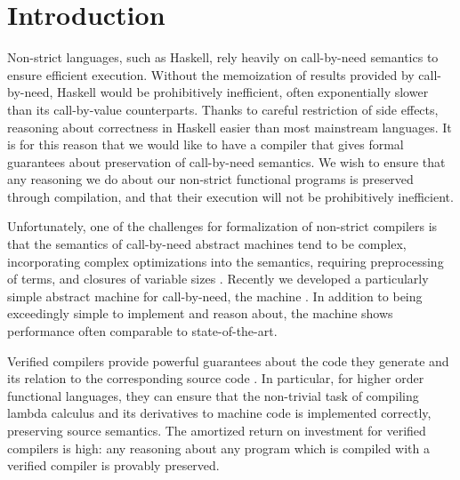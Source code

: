 \section{Introduction} \label{sec:introduction}
Non-strict languages, such as Haskell, rely heavily on call-by-need semantics to
ensure efficient execution. Without the memoization of results provided by
call-by-need, Haskell would be prohibitively inefficient, often exponentially
slower than its call-by-value counterparts. Thanks to careful restriction of
side effects, reasoning about correctness in Haskell easier than most mainstream
languages. It is for this reason that we would like to have a compiler that
gives formal guarantees about preservation of call-by-need semantics. We wish to
ensure that any reasoning we do about our non-strict functional programs is
preserved through compilation, and that their execution will not be
prohibitively inefficient.

Unfortunately, one of the challenges for formalization of non-strict compilers
is that the semantics of call-by-need abstract machines tend to be complex,
incorporating complex optimizations into the semantics, requiring preprocessing
of terms, and closures of variable sizes \cite{jonesstg, TIM}. Recently we
developed a particularly simple abstract machine for call-by-need, the
\ce machine \cite{cem}. In addition to being exceedingly simple to
implement and reason about, the machine shows performance often comparable to
state-of-the-art.

Verified compilers provide powerful guarantees about the code they generate and
its relation to the corresponding source code \cite{chlipala2007certified,
leroy2012compcert, cakeml14}.  In particular, for higher order functional
languages, they can ensure that the non-trivial task of compiling lambda
calculus and its derivatives to machine code is implemented correctly,
preserving source semantics. The amortized return on investment for verified
compilers is high: any reasoning about any program which is compiled with a
verified compiler is provably preserved. 

